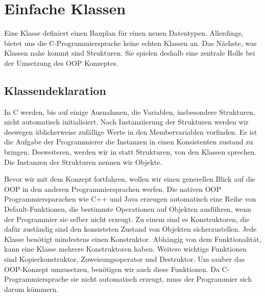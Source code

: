 
\section{Einfache Klassen}
Eine Klasse definiert einen Bauplan für einen neuen Datentypen.
Allerdings, bietet uns die C-Programmiersprache keine echten Klassen an.
Das Nächste, was Klassen nahe kommt sind Strukturen.
Sie spielen deshalb eine zentrale Rolle bei der Umsetzung des OOP Konzeptes.

\subsection{Klassendeklaration}

In C werden, bis auf einige Ausnahmen, die Variablen, insbesondere Strukturen, nicht automatisch initialisiert.
Nach Instanziierung der Strukturen werden wir deswegen üblicherweise zufällige Werte in den Membervariablen vorfinden.
Es ist die Aufgabe der Programmierer die Instanzen in einen Konsistenten zustand zu bringen.
Desweiteren, werden wir in statt Strukturen, von den Klassen sprechen.
Die Instanzen der Strukturen nennen wir Objekte.

Bevor wir mit dem Konzept fortfahren, wollen wir einen generellen Blick auf die OOP in den anderen Programmiersprachen werfen.
Die nativen OOP Programmiersparachen wie C++ und Java erzeugen automatisch eine Reihe von Default-Funktionen, die bestimmte Operationen auf Objekten ausführen, wenn der Programmier sie selber nicht erzeugt.
Zu einem sind es Konstruktoren, die dafür zuständig sind den konsisteten Zustand von Objekten sicherzustellen.
Jede Klasse benötigt mindestens einen Konstruktor.
Abhängig von dem Funktionalität, kann eine Klasse mehrere Konstruktoren haben.
Weitere wichtige Funktionen sind Kopierkonstruktor, Zuweisungsoperator und Destruktor.
Um sauber das OOP-Konzept umzusetzen, benötigen wir auch diese Funktionen.
Da C-Programmiersprache sie nicht automatisch erzeugt, muss der Programmier sich darum kümmern.

